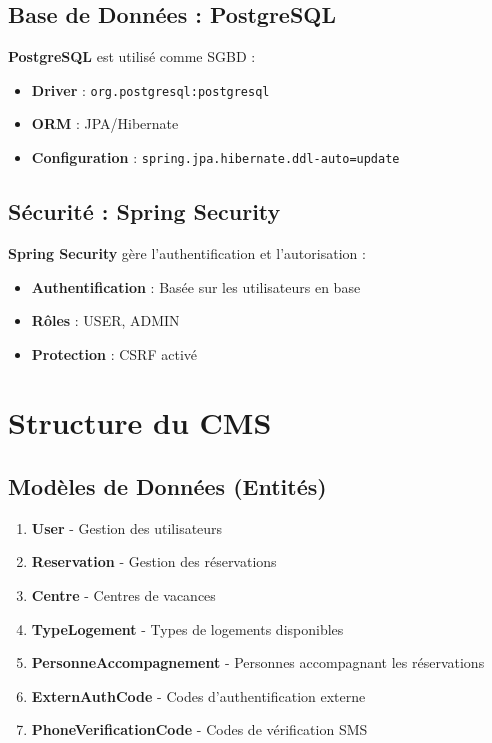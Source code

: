 \documentclass[12pt,a4paper]{article}
\begin{document}
\subsection{Base de Données : PostgreSQL}

\textbf{PostgreSQL} est utilisé comme SGBD :
\begin{itemize}
    \item \textbf{Driver} : \texttt{org.postgresql:postgresql}
    \item \textbf{ORM} : JPA/Hibernate
    \item \textbf{Configuration} : \texttt{spring.jpa.hibernate.ddl-auto=update}
\end{itemize}

\subsection{Sécurité : Spring Security}

\textbf{Spring Security} gère l'authentification et l'autorisation :
\begin{itemize}
    \item \textbf{Authentification} : Basée sur les utilisateurs en base
    \item \textbf{Rôles} : USER, ADMIN
    \item \textbf{Protection} : CSRF activé
\end{itemize}

\section{Structure du CMS}

\subsection{Modèles de Données (Entités)}

\begin{enumerate}
    \item \textbf{User} - Gestion des utilisateurs
    \item \textbf{Reservation} - Gestion des réservations
    \item \textbf{Centre} - Centres de vacances
    \item \textbf{TypeLogement} - Types de logements disponibles
    \item \textbf{PersonneAccompagnement} - Personnes accompagnant les réservations
    \item \textbf{ExternAuthCode} - Codes d'authentification externe
    \item \textbf{PhoneVerificationCode} - Codes de vérification SMS
\end{enumerate}
\end{document}
